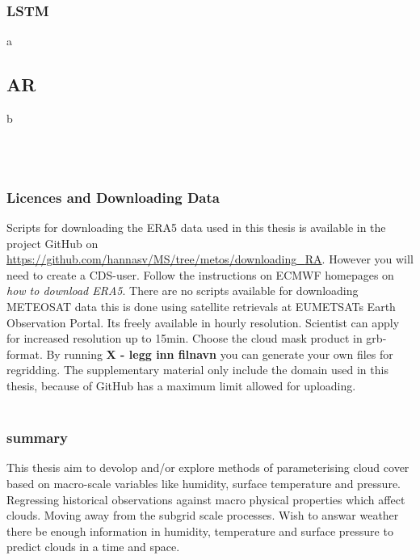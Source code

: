\subsubsection{LSTM}
a

\subsection{AR}
b



\\ \\
\subsubsection{Licences and Downloading Data} \label{sec:downloading_data}
Scripts for downloading the ERA5 data used in this thesis is available in the project GitHub on \href{https://github.com/hannasv/MS/tree/metos/downloading{\_}RA}{https://github.com/hannasv/MS/tree/metos/downloading{\_}RA}. However you will need to create a CDS-user. Follow the instructions on ECMWF homepages on \textit{how to download ERA5}. There are no scripts available for downloading METEOSAT data this is done using satellite retrievals at EUMETSATs Earth Observation Portal. Its freely available in hourly resolution. Scientist can apply for increased resolution up to 15min. Choose the cloud mask product in grb-format. By running \textbf{X - legg inn filnavn} you can generate your own files for regridding. The supplementary material only include the domain used in this thesis, because of GitHub has a maximum limit allowed for uploading. 
\\ \\ 
\subsubsection{summary}
This thesis aim to devolop and/or explore methods of parameterising cloud cover based on macro-scale variables like humidity, surface temperature and pressure. Regressing historical observations against macro physical properties which affect clouds. Moving away from the subgrid scale processes. Wish to answar weather there be enough information in humidity, temperature and surface pressure to predict clouds in a time and space.




